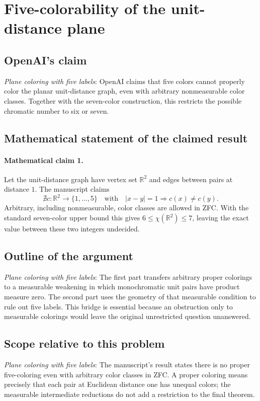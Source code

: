 \documentclass[11pt]{article}
\begin{document}
\section*{Five-colorability of the unit-distance plane}

\subsection{OpenAI's claim}
\textit{Plane coloring with five labels}: OpenAI claims that five colors cannot properly color the planar unit-distance graph, even with arbitrary nonmeasurable color classes. Together with the seven-color construction, this restricts the possible chromatic number to six or seven.

\subsection{Mathematical statement of the claimed result}
\paragraph{Mathematical claim 1.} Let the unit-distance graph have vertex set $\mathbb R^2$ and edges between pairs at distance $1$. The manuscript claims \[\nexists c:\mathbb R^2\to\{1,\ldots,5\}\quad\text{with}\quad|x-y|=1\Longrightarrow c(x)\ne c(y).\] Arbitrary, including nonmeasurable, color classes are allowed in ZFC. With the standard seven-color upper bound this gives $6\le\chi(\mathbb R^2)\le7$, leaving the exact value between these two integers undecided.

\subsection{Outline of the argument}
\textit{Plane coloring with five labels}: The first part transfers arbitrary proper colorings to a measurable weakening in which monochromatic unit pairs have product measure zero. The second part uses the geometry of that measurable condition to rule out five labels. This bridge is essential because an obstruction only to measurable colorings would leave the original unrestricted question unanswered.

\subsection{Scope relative to this problem}
\textit{Plane coloring with five labels}: The manuscript’s result states there is no proper five-coloring even with arbitrary color classes in ZFC. A proper coloring means precisely that each pair at Euclidean distance one has unequal colors; the measurable intermediate reductions do not add a restriction to the final theorem.
\end{document}
